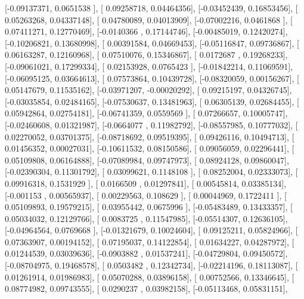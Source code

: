 \documentclass{article}
\begin{document}
       [-0.09137371,  0.0651538 ],
       [ 0.09258718,  0.04464356],
       [-0.03452439,  0.16853456],
       [ 0.05263268,  0.04337148],
       [ 0.04780089,  0.04013909],
       [-0.07002216,  0.0461868 ],
       [ 0.07411271,  0.12770469],
       [-0.0140366 ,  0.17144746],
       [-0.00485019,  0.12420274],
       [-0.10206821,  0.13680998],
       [ 0.00391584,  0.04669453],
       [-0.05116847,  0.09736867],
       [ 0.06163287,  0.12160968],
       [ 0.07510076,  0.15346867],
       [ 0.0172687 ,  0.19268233],
       [-0.09061021,  0.17299334],
       [ 0.02153928,  0.0765423 ],
       [-0.01842214,  0.11069591],
       [-0.06095125,  0.03664613],
       [ 0.07573864,  0.10439728],
       [-0.08320059,  0.00156267],
       [ 0.05147679,  0.11535162],
       [-0.03971207, -0.00020292],
       [ 0.09215197,  0.04326745],
       [-0.03035854,  0.02484165],
       [-0.07530637,  0.13481963],
       [ 0.06305139,  0.02684455],
       [ 0.05942864,  0.02754181],
       [-0.06741359,  0.0559569 ],
       [ 0.07266657,  0.10005747],
       [-0.02460608,  0.01321987],
       [-0.0664077 ,  0.11982792],
       [-0.08557985,  0.10777032],
       [ 0.02270052,  0.03701375],
       [-0.08718692,  0.09519395],
       [ 0.09426116,  0.10494713],
       [ 0.01456352,  0.00027031],
       [-0.10611532,  0.08150586],
       [ 0.09056059,  0.02296441],
       [ 0.05109808,  0.06164888],
       [-0.07089984,  0.09747973],
       [ 0.08924128,  0.09860047],
       [-0.02390304,  0.11301792],
       [ 0.03099621,  0.1148108 ],
       [ 0.08252004,  0.02333073],
       [ 0.09916318,  0.1531929 ],
       [ 0.0166509 ,  0.01297841],
       [ 0.00545814,  0.03385134],
       [-0.001153  ,  0.00565937],
       [ 0.00229563,  0.108629  ],
       [ 0.00044969,  0.1722411 ],
       [ 0.05109893,  0.19579215],
       [ 0.03955442,  0.0675996 ],
       [-0.05483489,  0.13433357],
       [ 0.05034032,  0.12129766],
       [ 0.0083725 ,  0.11547985],
       [-0.05514307,  0.12636105],
       [-0.04964564,  0.0769668 ],
       [-0.01321679,  0.10024604],
       [ 0.09125211,  0.05824966],
       [ 0.07363907,  0.00194152],
       [ 0.07195037,  0.14122854],
       [ 0.01634227,  0.04287972],
       [ 0.01244539,  0.03039636],
       [-0.0903882 ,  0.01537241],
       [-0.04729804,  0.09450572],
       [-0.08704975,  0.19468578],
       [ 0.0503482 ,  0.12342734],
       [-0.02214196,  0.18113087],
       [ 0.01261914,  0.01986983],
       [ 0.05070288,  0.03896158],
       [ 0.00752566,  0.13346645],
       [ 0.08774982,  0.09743555],
       [ 0.0290237 ,  0.03982158],
       [-0.05113468,  0.05831151],
\end{document}
